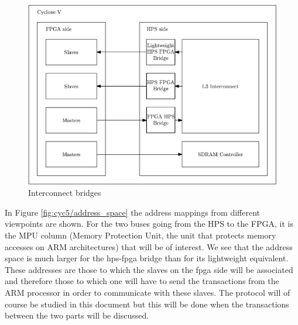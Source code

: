 \begin{figure}[H]
    \centering
    \includegraphics[scale=0.6]{Chapter1-Hardware/res/cycv_interconnect}
    \caption{Interconnect bridges}
    \label{fig:cyc5/interconnect}
\end{figure}

In Figure \ref{fig:cyc5/address_space} the address mappings from different viewpoints are shown. For 
the two buses going from the HPS to the FPGA, it is the MPU column (Memory Protection Unit, the unit 
that protects memory accesses on ARM architectures) that will be of interest. We see that the address 
space is much larger for the hps-fpga bridge than for its lightweight equivalent. These addresses 
are those to which the slaves on the fpga side will be associated and therefore those to which one
will have to send the transactions from the ARM processor in order to communicate with these slaves. 
The protocol will of course be studied in this document but this will be done when the transactions 
between the two parts will be discussed.

